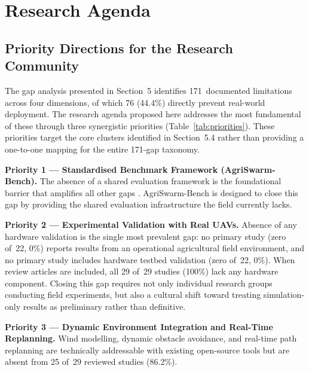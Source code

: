 \documentclass[review,3p]{elsarticle}
\begin{document}
\section{Research Agenda}

\subsection{Priority Directions for the Research Community}

The gap analysis presented in Section~5 identifies 171~documented limitations
across four dimensions, of which 76 (44.4\%) directly prevent real-world
deployment. The research agenda proposed here addresses the most fundamental of
these through three synergistic priorities (Table~\ref{tab:priorities}). These
priorities target the core clusters identified in Section~5.4 rather than
providing a one-to-one mapping for the entire 171-gap taxonomy.

\textbf{Priority 1 --- Standardised Benchmark Framework (AgriSwarm-Bench).}
The absence of a shared evaluation framework is the foundational barrier that
amplifies all other gaps \cite{brambilla2013}. AgriSwarm-Bench is designed to
close this gap by providing the shared evaluation infrastructure the field
currently lacks.

\textbf{Priority 2 --- Experimental Validation with Real UAVs.} Absence of
any hardware validation is the single most prevalent gap: no primary study
(zero of~22, 0\%) reports results from an operational agricultural field
environment, and no primary study includes hardware testbed validation
(zero of~22, 0\%). When review articles are included, all 29 of~29 studies
(100\%) lack any hardware component. Closing this gap requires not only
individual research groups conducting field experiments, but also a cultural
shift toward treating simulation-only results as preliminary rather than
definitive.

\textbf{Priority 3 --- Dynamic Environment Integration and Real-Time Replanning.}
Wind modelling, dynamic obstacle avoidance, and real-time path replanning are
technically addressable with existing open-source tools but are absent from
25 of~29 reviewed studies (86.2\%).
\end{document}
